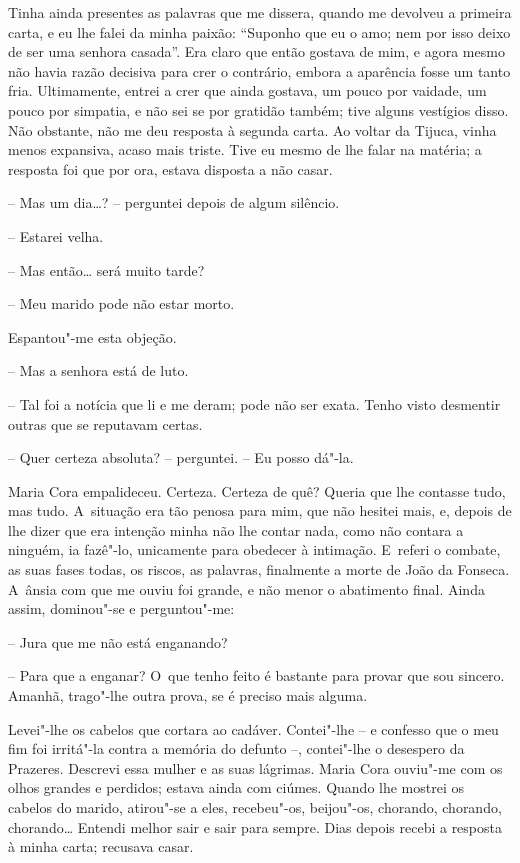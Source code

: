 Tinha ainda presentes as palavras que me dissera, quando me devolveu a
primeira carta, e eu lhe falei da minha paixão: ``Suponho que eu o amo;
nem por isso deixo de ser uma senhora casada''. Era claro que então
gostava de mim, e agora mesmo não havia razão decisiva para crer o
contrário, embora a aparência fosse um tanto fria. Ultimamente, entrei a
crer que ainda gostava, um pouco por vaidade, um pouco por simpatia, e
não sei se por gratidão também; tive alguns vestígios disso. Não
obstante, não me deu resposta à segunda carta. Ao voltar da Tijuca,
vinha menos expansiva, acaso mais triste. Tive eu mesmo de lhe falar na
matéria; a resposta foi que por ora, estava disposta a não casar.

-- Mas um dia\ldots{}? -- perguntei depois de algum silêncio.

-- Estarei velha.

-- Mas então\ldots{} será muito tarde?

-- Meu marido pode não estar morto.

Espantou"-me esta objeção.

-- Mas a senhora está de luto.

-- Tal foi a notícia que li e me deram; pode não ser exata. Tenho visto
desmentir outras que se reputavam certas.

-- Quer certeza absoluta? -- perguntei. -- Eu posso dá"-la.

Maria Cora empalideceu. Certeza. Certeza de quê? Queria que lhe contasse
tudo, mas tudo. A~situação era tão penosa para mim, que não hesitei
mais, e, depois de lhe dizer que era intenção minha não lhe contar nada,
como não contara a ninguém, ia fazê"-lo, unicamente para obedecer à
intimação. E~referi o combate, as suas fases todas, os riscos, as
palavras, finalmente a morte de João da Fonseca. A~ânsia com que me
ouviu foi grande, e não menor o abatimento final. Ainda assim,
dominou"-se e perguntou"-me:

-- Jura que me não está enganando?

-- Para que a enganar? O~que tenho feito é bastante para provar que sou
sincero. Amanhã, trago"-lhe outra prova, se é preciso mais alguma.

Levei"-lhe os cabelos que cortara ao cadáver. Contei"-lhe -- e confesso
que o meu fim foi irritá"-la contra a memória do defunto --, contei"-lhe o
desespero da Prazeres. Descrevi essa mulher e as suas lágrimas. Maria
Cora ouviu"-me com os olhos grandes e perdidos; estava ainda com ciúmes.
Quando lhe mostrei os cabelos do marido, atirou"-se a eles, recebeu"-os,
beijou"-os, chorando, chorando, chorando\ldots{} Entendi melhor sair e sair
para sempre. Dias depois recebi a resposta à minha carta; recusava
casar.

